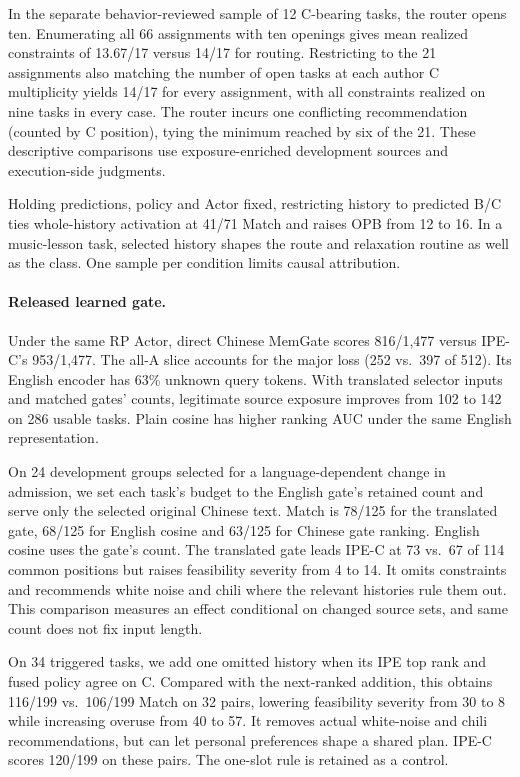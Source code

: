 \documentclass[11pt]{article}
\begin{document}
In the separate behavior-reviewed sample of 12 C-bearing tasks, the router opens ten. Enumerating all 66 assignments with ten openings gives mean realized constraints of 13.67/17 versus 14/17 for routing. Restricting to the 21 assignments also matching the number of open tasks at each author C multiplicity yields 14/17 for every assignment, with all constraints realized on nine tasks in every case. The router incurs one conflicting recommendation (counted by C position), tying the minimum reached by six of the 21. These descriptive comparisons use exposure-enriched development sources and execution-side judgments.

Holding predictions, policy and Actor fixed, restricting history to predicted B/C ties whole-history activation at 41/71 Match and raises OPB from 12 to 16. In a music-lesson task, selected history shapes the route and relaxation routine as well as the class. One sample per condition limits causal attribution.

\paragraph{Released learned gate.}
Under the same RP Actor, direct Chinese MemGate scores 816/1,477 versus IPE-C's 953/1,477. The all-A slice accounts for the major loss (252 vs.\ 397 of 512). Its English encoder has 63\% unknown query tokens. With translated selector inputs and matched gates' counts, legitimate source exposure improves from 102 to 142 on 286 usable tasks. Plain cosine has higher ranking AUC under the same English representation.

On 24 development groups selected for a language-dependent change in admission, we set each task's budget to the English gate's retained count and serve only the selected original Chinese text. Match is 78/125 for the translated gate, 68/125 for English cosine and 63/125 for Chinese gate ranking. English cosine uses the gate's count. The translated gate leads IPE-C at 73 vs.\ 67 of 114 common positions but raises feasibility severity from 4 to 14. It omits constraints and recommends white noise and chili where the relevant histories rule them out. This comparison measures an effect conditional on changed source sets, and same count does not fix input length.

On 34 triggered tasks, we add one omitted history when its IPE top rank and fused policy agree on C. Compared with the next-ranked addition, this obtains 116/199 vs.\ 106/199 Match on 32 pairs, lowering feasibility severity from 30 to 8 while increasing overuse from 40 to 57. It removes actual white-noise and chili recommendations, but can let personal preferences shape a shared plan. IPE-C scores 120/199 on these pairs. The one-slot rule is retained as a control.
\end{document}
